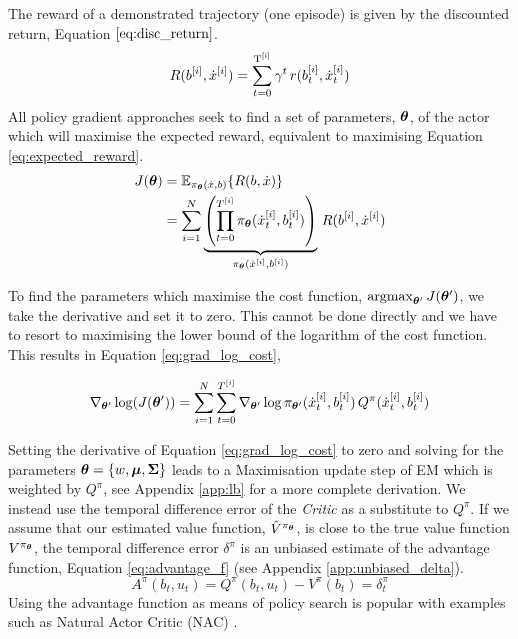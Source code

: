 The reward of a demonstrated trajectory (one episode) is given by the discounted return, Equation $\ref{eq:disc_return}$.
\begin{equation}\label{eq:disc_return}
 R(b^{[i]},\dot{x}^{[i]}) = \sum_{t=0}^{\mathrm{T^{[i]}}} \gamma^t \, r(b^{[i]}_t,\dot{x}^{[i]}_t)
\end{equation}
All policy gradient approaches seek to find a set of parameters, $\boldsymbol{\theta}$, of the actor
which will maximise the expected reward, equivalent to maximising Equation \ref{eq:expected_reward}.
\begin{align}\label{eq:expected_reward}
 J(\boldsymbol{\theta}) &= \mathbb{E}_{\pi_{\boldsymbol{\theta}}(\dot{x},b)}\{R(b,\dot{x})\} \nonumber \\
	  &= \sum\limits_{i=1}^{N}   \underbrace{\left( \prod_{t=0}^{T^{[i]}} \pi_{\boldsymbol{\theta}}(\dot{x}^{[i]}_t,b^{[i]}_t) \right)}_{\pi_{\boldsymbol{\theta}}(\dot{x}^{[i]},b^{[i]})} \, R(b^{[i]},\dot{x}^{[i]}) 
\end{align}

To find the parameters which maximise the cost function, $\argmax_{\Para'} J(\Para')$, we take the derivative and 
set it to zero. This cannot be done directly and we have to resort to maximising the lower bound of the logarithm 
of the cost function. This results in Equation \ref{eq:grad_log_cost},

\begin{equation} \label{eq:grad_log_cost}
    \nabla_{\boldsymbol{\theta}'}\log(J(\boldsymbol{\theta}')) = \sum\limits_{i=1}^{N} \sum\limits_{t=0}^{T^{[i]}} \nabla_{\boldsymbol{\theta}'}\log \pi_{\boldsymbol{\theta}'}(\dot{x}^{[i]}_t,b^{[i]}_t) \, Q^{\pi}(\dot{x}^{[i]}_t,b^{[i]}_t)
\end{equation}

Setting the derivative of Equation \ref{eq:grad_log_cost} to zero and solving for the parameters
$\boldsymbol{\theta}=\{w,\boldsymbol{\mu},\boldsymbol{\Sigma}\}$ leads to a Maximisation update step of EM
which is weighted by $Q^{\pi}$, see Appendix \ref{app:lb} for a more complete derivation.
We instead use the temporal difference error of the \textit{Critic} as a substitute 
to $Q^{\pi}$. If we assume that our estimated value function, $\hat{V}^{\pi_{\boldsymbol{\theta}}}$, is close to the true value function 
$V^{\pi_{\boldsymbol{\theta}}}$, the temporal difference error $\delta^{\pi}$ is an unbiased estimate of the advantage function, Equation \ref{eq:advantage_f} 
(see Appendix \ref{app:unbiased_delta}).
\begin{equation}\label{eq:advantage_f}
 A^{\pi}(b_t,u_t) = Q^{\pi}(b_t,u_t) - V^{\pi}(b_t) = \delta^{\pi}_t
\end{equation}
Using the advantage function as means of policy search is popular with examples such as
Natural Actor Critic (NAC) \cite{peter_nac_2008}.

